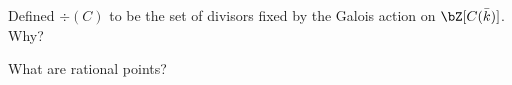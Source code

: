 Defined $\div(C)$ to be the set of divisors fixed by the Galois action on $\bZ[C(\bar k)]$.
Why?

What are rational points?
